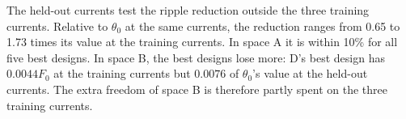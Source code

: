 The held-out currents test the ripple reduction outside the three
training currents. Relative to $\theta_0$ at the same currents, the
reduction ranges from 0.65 to 1.73 times its value at the training
currents. In space A it is within 10\% for all five best designs. In space
B, the best designs lose more: D's best design has
$0.0044F_0$ at the training currents but $0.0076$ of $\theta_0$'s value at
the held-out currents. The extra freedom of space B is therefore partly
spent on the three training currents.

\begin{table}[H]\centering\scriptsize
\caption{Final checks of the selected designs. ``best'' marks a method's
representative; ``A $T_{90}$'' marks the earliest repeat-1 crossing of that
target by that method. The L2 column is the primary check on the
refinement host. ``held-out'' is the objective at currents $0.25$ and
$0.75$ relative to $\theta_0$'s at the same currents. A dash means the
conforming check does not apply because stator offsets are nonzero.}
\label{tab:exp2-refinement}
\end{table}
